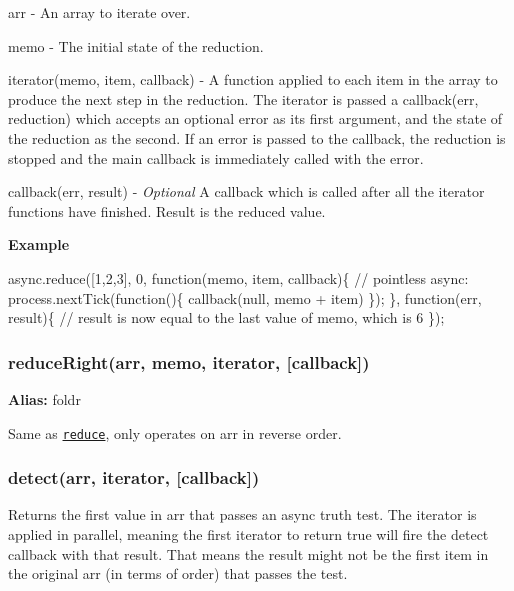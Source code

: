 \begin{DoxyItemize}
\item {\ttfamily arr} -\/ An array to iterate over.
\item {\ttfamily memo} -\/ The initial state of the reduction.
\item {\ttfamily iterator(memo, item, callback)} -\/ A function applied to each item in the array to produce the next step in the reduction. The {\ttfamily iterator} is passed a {\ttfamily callback(err, reduction)} which accepts an optional error as its first argument, and the state of the reduction as the second. If an error is passed to the callback, the reduction is stopped and the main {\ttfamily callback} is immediately called with the error.
\item {\ttfamily callback(err, result)} -\/ {\itshape Optional} A callback which is called after all the {\ttfamily iterator} functions have finished. Result is the reduced value.
\end{DoxyItemize}

{\bfseries Example}


\begin{DoxyCode}
async.reduce([1,2,3], 0, function(memo, item, callback)\{
    // pointless async:
    process.nextTick(function()\{
        callback(null, memo + item)
    \});
\}, function(err, result)\{
    // result is now equal to the last value of memo, which is 6
\});
\end{DoxyCode}
 



\label{_reduceRight}%
 \subsubsection*{reduce\+Right(arr, memo, iterator, \mbox{[}callback\mbox{]})}

{\bfseries Alias\+:} {\ttfamily foldr}

Same as \href{#reduce}{\tt {\ttfamily reduce}}, only operates on {\ttfamily arr} in reverse order.





\label{_detect}%
 \subsubsection*{detect(arr, iterator, \mbox{[}callback\mbox{]})}

Returns the first value in {\ttfamily arr} that passes an async truth test. The {\ttfamily iterator} is applied in parallel, meaning the first iterator to return {\ttfamily true} will fire the detect {\ttfamily callback} with that result. That means the result might not be the first item in the original {\ttfamily arr} (in terms of order) that passes the test.

